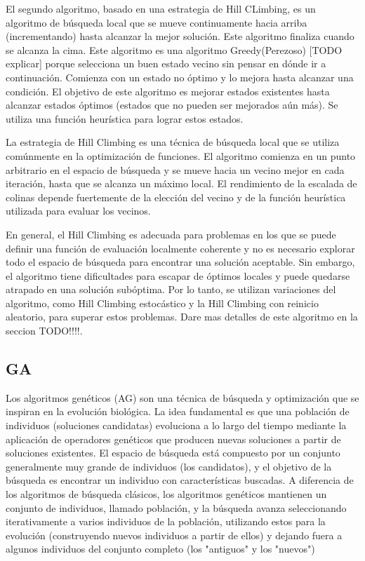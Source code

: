 El segundo algoritmo, basado en una estrategia de Hill CLimbing\cite{TODO, qué citar sobre hill climbing}, es un algoritmo de búsqueda local que se mueve continuamente hacia arriba (incrementando) hasta alcanzar la mejor solución. Este algoritmo finaliza cuando se alcanza la cima. Este algoritmo es una algoritmo Greedy(Perezoso) [TODO explicar] porque selecciona un buen estado vecino sin pensar en dónde ir a continuación. Comienza con un estado no óptimo y lo mejora hasta alcanzar una condición. El objetivo de este algoritmo es mejorar estados existentes hasta alcanzar estados óptimos (estados que no pueden ser mejorados aún más). Se utiliza una función heurística para lograr estos estados.

La estrategia de Hill Climbing es una técnica de búsqueda local que se utiliza comúnmente en la optimización de funciones. El algoritmo comienza en un punto arbitrario en el espacio de búsqueda y se mueve hacia un vecino mejor en cada iteración, hasta que se alcanza un máximo local. El rendimiento de la escalada de colinas depende fuertemente de la elección del vecino y de la función heurística utilizada para evaluar los vecinos.

En general, el Hill Climbing es adecuada para problemas en los que se puede definir una función de evaluación localmente coherente y no es necesario explorar todo el espacio de búsqueda para encontrar una solución aceptable. Sin embargo, el algoritmo tiene dificultades para escapar de óptimos locales y puede quedarse atrapado en una solución subóptima. Por lo tanto, se utilizan variaciones del algoritmo, como Hill Climbing estocástico y la Hill Climbing con reinicio aleatorio, para superar estos problemas.
Dare mas detalles de este algoritmo en la seccion {TODO!!!!}.


\subsection{GA}
\label{alg:approachGA}
Los algoritmos genéticos (AG) son una técnica de búsqueda y optimización que se inspiran en la evolución biológica. La idea fundamental es que una población de individuos (soluciones candidatas) evoluciona a lo largo del tiempo mediante la aplicación de operadores genéticos que producen nuevas soluciones a partir de soluciones existentes. El espacio de búsqueda está compuesto por un conjunto generalmente muy grande de individuos (los candidatos), y el objetivo de la búsqueda es encontrar un individuo con características buscadas. A diferencia de los algoritmos de búsqueda clásicos, los algoritmos genéticos mantienen un conjunto de individuos, llamado población, y la búsqueda avanza seleccionando iterativamente a varios individuos de la población, utilizando estos para la evolución (construyendo nuevos individuos a partir de ellos) y dejando fuera a algunos individuos del conjunto completo (los "antiguos" y los "nuevos")

